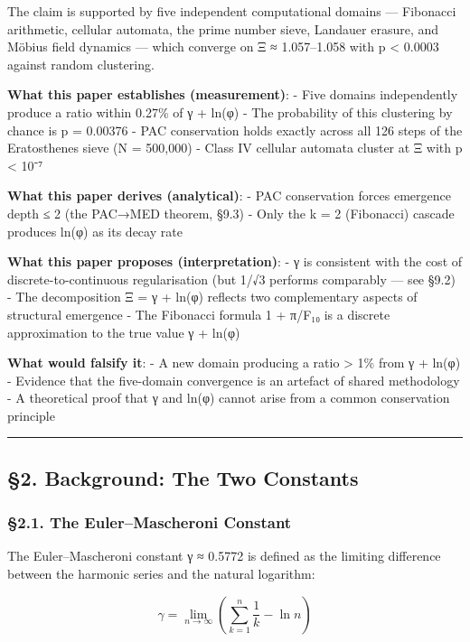 \documentclass[
  11pt,
  a4paper]{article}
\begin{document}
The claim is supported by five independent computational domains ---
Fibonacci arithmetic, cellular automata, the prime number sieve,
Landauer erasure, and Möbius field dynamics --- which converge on Ξ ≈
1.057--1.058 with p \textless{} 0.0003 against random clustering.

\textbf{What this paper establishes (measurement)}: - Five domains
independently produce a ratio within 0.27\% of γ + ln(φ) - The
probability of this clustering by chance is p = 0.00376 - PAC
conservation holds exactly across all 126 steps of the Eratosthenes
sieve (N = 500,000) - Class IV cellular automata cluster at Ξ with p
\textless{} 10⁻⁷

\textbf{What this paper derives (analytical)}: - PAC conservation forces
emergence depth ≤ 2 (the PAC→MED theorem, §9.3) - Only the k = 2
(Fibonacci) cascade produces ln(φ) as its decay rate

\textbf{What this paper proposes (interpretation)}: - γ is consistent
with the cost of discrete-to-continuous regularisation (but 1/√3
performs comparably --- see §9.2) - The decomposition Ξ = γ + ln(φ)
reflects two complementary aspects of structural emergence - The
Fibonacci formula 1 + π/F₁₀ is a discrete approximation to the true
value γ + ln(φ)

\textbf{What would falsify it}: - A new domain producing a ratio
\textgreater{} 1\% from γ + ln(φ) - Evidence that the five-domain
convergence is an artefact of shared methodology - A theoretical proof
that γ and ln(φ) cannot arise from a common conservation principle

\begin{center}\rule{0.5\linewidth}{0.5pt}\end{center}

\subsection{§2. Background: The Two
Constants}\label{background-the-two-constants}

\subsubsection{§2.1. The Euler--Mascheroni
Constant}\label{the-eulermascheroni-constant}

The Euler--Mascheroni constant γ ≈ 0.5772 is defined as the limiting
difference between the harmonic series and the natural logarithm:

\[\gamma = \lim_{n \to \infty} \left( \sum_{k=1}^{n} \frac{1}{k} - \ln n \right)\]
\end{document}

